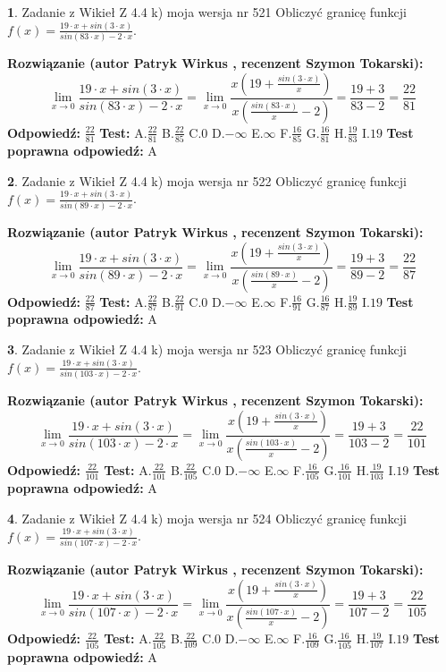 \documentclass[12pt, a4paper]{article}
\theoremstyle{definition} %
\newtheorem{zad}{}
\newcommand{\zadStart}[1]{\begin{zad}#1\newline}
\newcommand{\zadStop}{\end{zad}}
\newcommand{\rozwStart}[2]{\noindent \textbf{Rozwiązanie (autor #1 , recenzent #2): }\newline}
\newcommand{\rozwStop}{\newline}
\newcommand{\odpStart}{\noindent \textbf{Odpowiedź:}\newline}
\newcommand{\odpStop}{\newline}
\newcommand{\testStart}{\noindent \textbf{Test:}\newline}
\newcommand{\testStop}{\newline}
\newcommand{\kluczStart}{\noindent \textbf{Test poprawna odpowiedź:}\newline}
\newcommand{\kluczStop}{\newline}
\begin{document}
\zadStart{Zadanie z Wikieł Z 4.4 k) moja wersja nr 521}
Obliczyć granicę funkcji $f(x)=\frac{19\cdot x +sin(3\cdot x)}{sin(83\cdot x) -2\cdot x}$.
\zadStop
\rozwStart{Patryk Wirkus}{Szymon Tokarski}
$$\lim\limits_{x\to 0}\frac{19\cdot x +sin(3\cdot x)}{sin(83\cdot x) -2\cdot x}
=\lim\limits_{x\to 0}\frac{x(19+\frac{sin(3\cdot x)}{x})}{x(\frac{sin(83\cdot x)}{x}-2)}
=\frac{19+3}{83-2} = \frac{22}{81}$$
\rozwStop
\odpStart
$\frac{22}{81}$
\odpStop
\testStart
A.$\frac{22}{81}$
B.$\frac{22}{85}$
C.$0$
D.$-\infty$
E.$\infty$
F.$\frac{16}{85}$
G.$\frac{16}{81}$
H.$\frac{19}{83}$
I.$19$
\testStop
\kluczStart
A
\kluczStop



\zadStart{Zadanie z Wikieł Z 4.4 k) moja wersja nr 522}
Obliczyć granicę funkcji $f(x)=\frac{19\cdot x +sin(3\cdot x)}{sin(89\cdot x) -2\cdot x}$.
\zadStop
\rozwStart{Patryk Wirkus}{Szymon Tokarski}
$$\lim\limits_{x\to 0}\frac{19\cdot x +sin(3\cdot x)}{sin(89\cdot x) -2\cdot x}
=\lim\limits_{x\to 0}\frac{x(19+\frac{sin(3\cdot x)}{x})}{x(\frac{sin(89\cdot x)}{x}-2)}
=\frac{19+3}{89-2} = \frac{22}{87}$$
\rozwStop
\odpStart
$\frac{22}{87}$
\odpStop
\testStart
A.$\frac{22}{87}$
B.$\frac{22}{91}$
C.$0$
D.$-\infty$
E.$\infty$
F.$\frac{16}{91}$
G.$\frac{16}{87}$
H.$\frac{19}{89}$
I.$19$
\testStop
\kluczStart
A
\kluczStop



\zadStart{Zadanie z Wikieł Z 4.4 k) moja wersja nr 523}
Obliczyć granicę funkcji $f(x)=\frac{19\cdot x +sin(3\cdot x)}{sin(103\cdot x) -2\cdot x}$.
\zadStop
\rozwStart{Patryk Wirkus}{Szymon Tokarski}
$$\lim\limits_{x\to 0}\frac{19\cdot x +sin(3\cdot x)}{sin(103\cdot x) -2\cdot x}
=\lim\limits_{x\to 0}\frac{x(19+\frac{sin(3\cdot x)}{x})}{x(\frac{sin(103\cdot x)}{x}-2)}
=\frac{19+3}{103-2} = \frac{22}{101}$$
\rozwStop
\odpStart
$\frac{22}{101}$
\odpStop
\testStart
A.$\frac{22}{101}$
B.$\frac{22}{105}$
C.$0$
D.$-\infty$
E.$\infty$
F.$\frac{16}{105}$
G.$\frac{16}{101}$
H.$\frac{19}{103}$
I.$19$
\testStop
\kluczStart
A
\kluczStop



\zadStart{Zadanie z Wikieł Z 4.4 k) moja wersja nr 524}
Obliczyć granicę funkcji $f(x)=\frac{19\cdot x +sin(3\cdot x)}{sin(107\cdot x) -2\cdot x}$.
\zadStop
\rozwStart{Patryk Wirkus}{Szymon Tokarski}
$$\lim\limits_{x\to 0}\frac{19\cdot x +sin(3\cdot x)}{sin(107\cdot x) -2\cdot x}
=\lim\limits_{x\to 0}\frac{x(19+\frac{sin(3\cdot x)}{x})}{x(\frac{sin(107\cdot x)}{x}-2)}
=\frac{19+3}{107-2} = \frac{22}{105}$$
\rozwStop
\odpStart
$\frac{22}{105}$
\odpStop
\testStart
A.$\frac{22}{105}$
B.$\frac{22}{109}$
C.$0$
D.$-\infty$
E.$\infty$
F.$\frac{16}{109}$
G.$\frac{16}{105}$
H.$\frac{19}{107}$
I.$19$
\testStop
\kluczStart
A
\kluczStop
\end{document}
